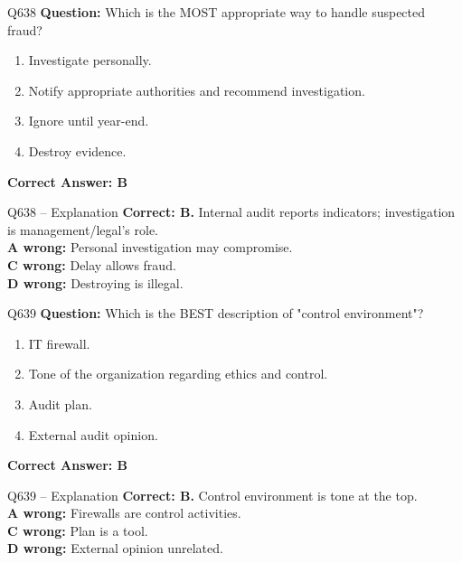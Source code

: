\documentclass[aspectratio=169,10pt]{beamer}
\begin{document}
	\begin{frame}[t]{Q638}
		\small
		\textbf{Question:} Which is the MOST appropriate way to handle suspected fraud?
		\begin{enumerate}[label=\Alph*.,itemsep=1pt,topsep=2pt]
			\item Investigate personally.
			\item Notify appropriate authorities and recommend investigation.
			\item Ignore until year-end.
			\item Destroy evidence.
		\end{enumerate}
		\vspace{4pt}
		\textbf{Correct Answer: B}
	\end{frame}
	
	\begin{frame}[t]{Q638 -- Explanation}
		\small
		\textbf{Correct: B.} Internal audit reports indicators; investigation is management/legal's role. \\[4pt]
		\textbf{A wrong:} Personal investigation may compromise. \\[2pt]
		\textbf{C wrong:} Delay allows fraud. \\[2pt]
		\textbf{D wrong:} Destroying is illegal.
	\end{frame}
	
	\begin{frame}[t]{Q639}
		\small
		\textbf{Question:} Which is the BEST description of "control environment"?
		\begin{enumerate}[label=\Alph*.,itemsep=1pt,topsep=2pt]
			\item IT firewall.
			\item Tone of the organization regarding ethics and control.
			\item Audit plan.
			\item External audit opinion.
		\end{enumerate}
		\vspace{4pt}
		\textbf{Correct Answer: B}
	\end{frame}
	
	\begin{frame}[t]{Q639 -- Explanation}
		\small
		\textbf{Correct: B.} Control environment is tone at the top. \\[4pt]
		\textbf{A wrong:} Firewalls are control activities. \\[2pt]
		\textbf{C wrong:} Plan is a tool. \\[2pt]
		\textbf{D wrong:} External opinion unrelated.
	\end{frame}
	
\end{document}
